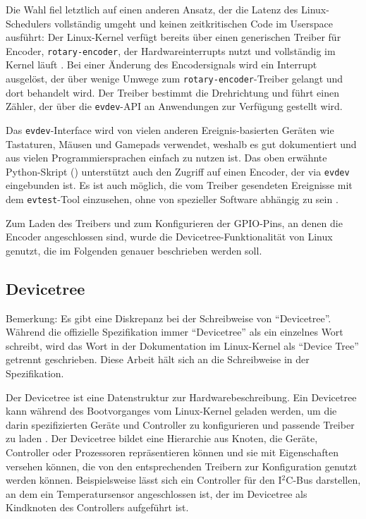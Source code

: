 \documentclass[german]{thesis_KBS}
\newcommand{\code}[1]{\texttt{#1}}  %
\begin{document}
Die Wahl fiel letztlich auf einen anderen Ansatz, der die Latenz des
Linux-Schedulers vollständig umgeht und keinen zeitkritischen Code im Userspace
ausführt: Der Linux-Kernel verfügt bereits über einen generischen Treiber für
Encoder, \code{rotary-encoder}, der Hardwareinterrupts nutzt und vollständig im
Kernel läuft \cite{rotary-encoder}. Bei einer Änderung des Encodersignals wird
ein Interrupt ausgelöst, der über wenige Umwege zum
\code{rotary-encoder}-Treiber gelangt und dort behandelt wird. Der Treiber
bestimmt die Drehrichtung und führt einen Zähler, der über die \code{evdev}-API
an Anwendungen zur Verfügung gestellt wird.

Das \code{evdev}-Interface wird von vielen anderen Ereignis-basierten Geräten
wie Tastaturen, Mäusen und Gamepads verwendet, weshalb es gut dokumentiert und
aus vielen Programmiersprachen einfach zu nutzen ist. Das oben erwähnte
Python-Skript () unterstützt auch den Zugriff auf einen
Encoder, der via \code{evdev} eingebunden ist. Es ist auch möglich, die vom
Treiber gesendeten Ereignisse mit dem \code{evtest}-Tool einzusehen, ohne von
spezieller Software abhängig zu sein \cite{evtest-man}.

Zum Laden des Treibers und zum Konfigurieren der GPIO-Pins, an denen die Encoder
angeschlossen sind, wurde die Devicetree-Funktionalität von Linux genutzt, die
im Folgenden genauer beschrieben werden soll.


\subsection{Devicetree}
\label{subsec:devicetree}

\begin{framed}
Bemerkung: Es gibt eine Diskrepanz bei der Schreibweise von "`Devicetree"'.
Während die offizielle Spezifikation \cite{devicetree-spec} immer "`Devicetree"'
als ein einzelnes Wort schreibt, wird das Wort in der Dokumentation im
Linux-Kernel \cite{devicetree-in-linux} als "`Device Tree"' getrennt
geschrieben. Diese Arbeit hält sich an die Schreibweise in der Spezifikation.
\end{framed}

Der Devicetree ist eine Datenstruktur zur Hardwarebeschreibung. Ein Devicetree
kann während des Bootvorganges vom Linux-Kernel geladen werden, um die darin
spezifizierten Geräte und Controller zu konfigurieren und passende Treiber zu
laden \cite{devicetree-in-linux}. Der Devicetree bildet eine Hierarchie aus
Knoten, die Geräte, Controller oder Prozessoren repräsentieren können und sie
mit Eigenschaften versehen können, die von den entsprechenden Treibern zur
Konfiguration genutzt werden können. Beispielsweise lässt sich ein Controller
für den I$^2$C-Bus darstellen, an dem ein Temperatursensor angeschlossen ist,
der im Devicetree als Kindknoten des Controllers aufgeführt ist.
\end{document}
